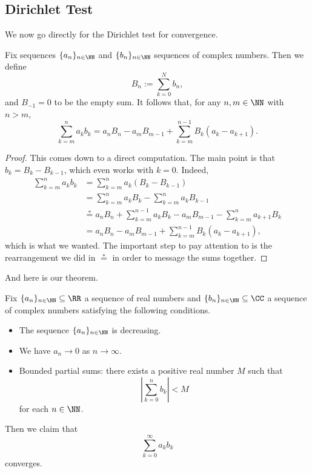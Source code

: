 \subsection{Dirichlet Test}
We now go directly for the Dirichlet test for convergence.
\begin{lemma} \label{lem:sumparts}
	Fix sequences $\{a_n\}_{n\in\NN}$ and $\{b_n\}_{n\in\NN}$ sequences of complex numbers. Then we define
	\[B_n:=\sum_{k=0}^Nb_n,\]
	and $B_{-1}=0$ to be the empty sum. It follows that, for any $n,m\in\NN$ with $n>m$,
	\[\sum_{k=m}^na_kb_k=a_nB_n-a_mB_{m-1}+\sum_{k=m}^{n-1}B_k(a_k-a_{k+1}).\]
\end{lemma}
\begin{proof}
	This comes down to a direct computation. The main point is that $b_k=B_k-B_{k-1}$, which even works with $k=0$. Indeed,
	\begin{align*}
		\sum_{k=m}^na_kb_k &= \sum_{k=m}^na_k(B_k-B_{k-1}) \\
		&= \sum_{k=m}^na_kB_k-\sum_{k=m}^na_kB_{k-1} \\
		&\stackrel*= a_nB_n+\sum_{k=m}^{n-1}a_kB_k-a_mB_{m-1}-\sum_{k=m}^na_{k+1}B_k \\
		&= a_nB_n-a_mB_{m-1}+\sum_{k=m}^{n-1}B_k(a_k-a_{k+1}),
	\end{align*}
	which is what we wanted. The important step to pay attention to is the rearrangement we did in $\stackrel*=$ in order to message the sums together.
\end{proof}
And here is our theorem.
\begin{theorem}
	Fix $\{a_n\}_{n\in\NN}\subseteq\RR$ a sequence of real numbers and $\{b_n\}_{n\in\NN}\subseteq\CC$ a sequence of complex numbers satisfying the following conditions.
	\begin{itemize}
		\item The sequence $\{a_n\}_{n\in\NN}$ is decreasing.
		\item We have $a_n\to0$ as $n\to\infty$.
		\item Bounded partial sums: there exists a positive real number $M$ such that
		\[\left|\sum_{k=0}^nb_k\right|<M\]
		for each $n\in\NN$.
	\end{itemize}
	Then we claim that
	\[\sum_{k=0}^\infty a_kb_k\]
	converges.
\end{theorem}
